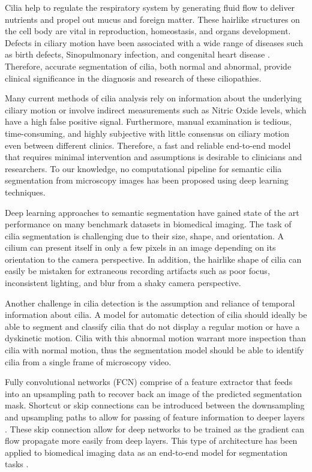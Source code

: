 \documentclass{llncs}
\begin{document}
Cilia help to regulate the respiratory system by generating fluid flow to deliver nutrients and propel out mucus and foreign matter. These hairlike structures on the cell body are vital in reproduction, homeostasis, and  organs development. Defects in ciliary motion have been associated with a wide range of diseases such as birth defects, Sinopulmonary infection, and congenital heart disease \cite{Ciliopathy}. Therefore, accurate segmentation of cilia, both normal and abnormal, provide clinical significance in the diagnosis and research of these ciliopathies. 
\par 
Many current methods of cilia analysis rely on information about the underlying ciliary motion or involve indirect measurements such as Nitric Oxide levels, which have a high false positive signal. Furthermore,  manual examination is tedious, time-consuming, and highly subjective with little consensus on ciliary motion even between different clinics. Therefore, a fast and reliable end-to-end model that requires minimal intervention and assumptions is desirable to clinicians and researchers. To our knowledge, no computational pipeline for semantic cilia segmentation from microscopy images has been proposed using deep learning techniques. 
\par
Deep learning approaches to semantic segmentation have gained state of the art performance on many benchmark datasets in biomedical imaging. The task of cilia segmentation is challenging due to their size, shape, and orientation. A cilium can present itself in only a few pixels in an image depending on its orientation to the camera perspective. In addition, the hairlike shape of cilia can easily be mistaken for extraneous recording artifacts such as poor focus, inconsistent lighting, and blur from a shaky camera perspective.
\par
Another challenge in cilia detection is the assumption and reliance of temporal information about cilia. A model for automatic detection of cilia should ideally be able to segment and classify cilia that do not display a regular motion or have a dyskinetic motion. Cilia with this abnormal motion warrant more inspection than cilia with normal motion, thus the segmentation model should be able to identify cilia from a single frame of microscopy video. 
\par 
Fully convolutional networks (FCN) \cite{FCN} comprise of a feature extractor that feeds into an upsampling path to recover back an image of the predicted segmentation mask. Shortcut or skip connections can be introduced between the downsampling and upsampling paths to allow for passing of feature information to deeper layers \cite{Highway}. These skip connection allow for deep networks to be trained as the gradient can flow propagate more easily from deep layers. This type of architecture has been applied to biomedical imaging data as an end-to-end model for segmentation tasks \cite{U-Net}.
\end{document}
